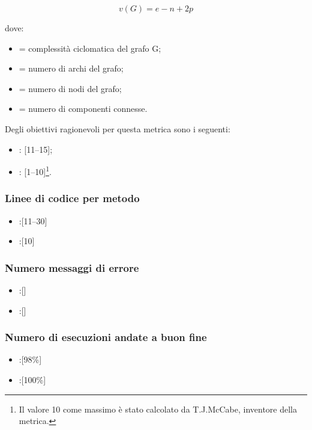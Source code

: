 $$v(G) = e - n + 2p$$

dove:
\begin{itemize}
\item {} = complessità ciclomatica del grafo G;
\item {} = numero di archi del grafo;
\item {} = numero di nodi del grafo;
\item {} = numero di componenti connesse.
\end{itemize}
Degli obiettivi ragionevoli per questa metrica sono i seguenti:
\begin{itemize}
\item {}: [11--15];
\item {}: [1--10]\footnote{Il valore 10 come massimo è stato calcolato da T.J.McCabe, inventore della metrica.}.
\end{itemize}

\subsubsection{Linee di codice per metodo}
\begin{itemize}
\item {}:[11--30]
\item {}:[10]
\end{itemize}

\subsubsection{Numero messaggi di errore}
\begin{itemize}
\item {}:[]
\item {}:[]
\end{itemize}

\subsubsection{Numero di esecuzioni andate a buon fine}
\begin{itemize}
\item {}:[98\%]
\item {}:[100\%]
\end{itemize}

